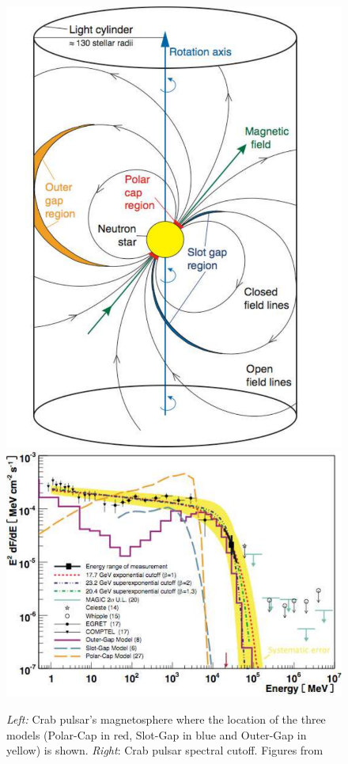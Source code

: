 \documentclass[main.tex]{subfiles}
\begin{document}
\begin{figure}[!htb]
\includegraphics[width=\linewidth]{Pictures/pulsargaps.pdf}
\endminipage\hfill
{}
\includegraphics[width=\linewidth]{Pictures/crabcutoff.pdf}
\endminipage\hfill
\caption{\label{fig:crabpulsar} \textit{Left:} Crab pulsar's magnetosphere where the location of the three models (Polar-Cap in red, Slot-Gap in blue and Outer-Gap in yellow) is shown. \textit{Right}: Crab pulsar spectral cutoff. Figures from \cite{2008crabmagic}}
\end{figure}
\end{document}
